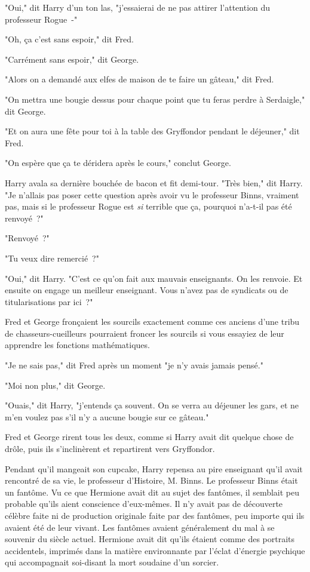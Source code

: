"Oui," dit Harry d'un ton las, "j'essaierai de ne pas attirer l'attention du professeur Rogue~-"

"Oh, ça c'est sans espoir," dit Fred.

"Carrément sans espoir," dit George.

"Alors on a demandé aux elfes de maison de te faire un gâteau," dit Fred.

"On mettra une bougie dessus pour chaque point que tu feras perdre à Serdaigle," dit George.

"Et on aura une fête pour toi à la table des Gryffondor pendant le déjeuner," dit Fred.

"On espère que ça te déridera après le cours," conclut George.

Harry avala sa dernière bouchée de bacon et fit demi-tour. "Très bien," dit Harry. "Je n'allais pas poser cette question après avoir vu le professeur Binns, vraiment pas, mais si le professeur Rogue est \emph{si} terrible que ça, pourquoi n'a-t-il pas été renvoyé~?"

"Renvoyé~?"

"Tu veux dire remercié~?"

"Oui," dit Harry. "C'est ce qu'on fait aux mauvais enseignants. On les renvoie. Et ensuite on engage un meilleur enseignant. Vous n'avez pas de syndicats ou de titularisations par ici~?"

Fred et George fronçaient les sourcils exactement comme ces anciens d'une tribu de chasseurs-cueilleurs pourraient froncer les sourcils si vous essayiez de leur apprendre les fonctions mathématiques.

"Je ne sais pas," dit Fred après un moment "je n'y avais jamais pensé."

"Moi non plus," dit George.

"Ouais," dit Harry, "j'entends ça souvent. On se verra au déjeuner les gars, et ne m'en voulez pas s'il n'y a aucune bougie sur ce gâteau."

Fred et George rirent tous les deux, comme si Harry avait dit quelque chose de drôle, puis ils s'inclinèrent et repartirent vers Gryffondor.

Pendant qu'il mangeait son cupcake, Harry repensa au pire enseignant qu'il avait rencontré de sa vie, le professeur d'Histoire, M. Binns. Le professeur Binns était un fantôme. Vu ce que Hermione avait dit au sujet des fantômes, il semblait peu probable qu'ils aient conscience d'eux-mêmes. Il n'y avait pas de découverte célèbre faite ni de production originale faite par des fantômes, peu importe qui ils avaient été de leur vivant. Les fantômes avaient généralement du mal à se souvenir du siècle actuel. Hermione avait dit qu'ils étaient comme des portraits accidentels, imprimés dans la matière environnante par l'éclat d'énergie psychique qui accompagnait soi-disant la mort soudaine d'un sorcier.

